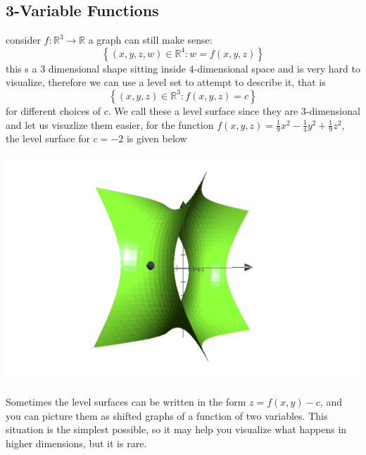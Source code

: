 \documentclass[11pt]{book}
\begin{document}


\subsection{3-Variable Functions}%
\label{sub:3_variable_functions}

consider $f : \mathbb{R} ^{3}  \to \mathbb{R} $ a graph can still make sense: 
\[
    \left\{ \left( x,y,z,w \right) \in \mathbb{R} ^{4} : w= f\left(x,y,z\right)  \right\} 
\]
this s a 3 dimensional shape sitting inside 4-dimensional space and is very hard to visualize, therefore we can use a level set to attempt to describe it, that is 
\[
    \left\{ \left( x,y,z \right) \in  \mathbb{R}^{3} : f\left( x,y,z \right) = c \right\} 
\]
for different choices of $c$. We call these a level surface since they are 3-dimensional and let us visuzlize them easier, for the function $f\left(x,y,z\right) = \frac{1}{9}x^2  - \frac{1}{4}y^2  + \frac{1}{9}z^2 $,  the level surface for $c= -2$ is given below

\begin{center}
    \includegraphics[width=\textwidth]{assets/-2-surf.jpg} 
\end{center}

Sometimes the level surfaces can be written in the form $z=f(x,y)-c$, and you can picture them as shifted graphs of a function of two variables. This situation is the simplest possible, so it may help you visualize what happens in higher dimensions, but it is rare.

\end{document}

